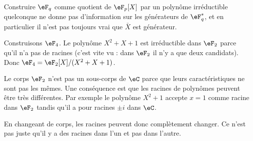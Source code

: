 Construire \( \eF_q\) comme quotient de \( \eF_p[X]\) par un polynôme irréductible quelconque ne donne pas d'information sur les générateurs de \( \eF_q^*\), et en particulier il n'est pas toujours vrai que \( \bar X\) est générateur.

\begin{example}
	Construisons \( \eF_4\). Le polynôme \( X^2+X+1\) est irréductible dans \( \eF_2\) parce qu'il n'a pas de racines (c'est vite vu : dans \( \eF_2\) il n'y a que deux candidats). Donc \( \eF_4=\eF_2[X]/(X^2+X+1)\).
\end{example}

\begin{remark}
	Le corps \( \eF_2\) n'est pas un sous-corps de \( \eC\) parce que leurs caractéristiques ne sont pas les mêmes. Une conséquence est que les racines de polynômes peuvent être très différentes. Par exemple le polynôme \( X^2+1\) accepte \( x=1\) comme racine dans \( \eF_2\) tandis qu'il a pour racines \( \pm i\) dans \( \eC\).

	En changeant de corps, les racines peuvent donc complètement changer. Ce n'est pas juste qu'il y a des racines dans l'un et pas dans l'autre.
\end{remark}

